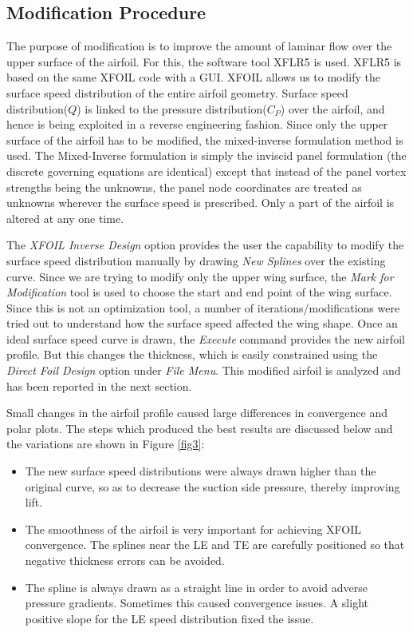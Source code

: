 \documentclass[main.tex]{subfiles}
\begin{document}
\subsection{Modification Procedure}
\par The purpose of modification is to improve the amount of laminar flow over the upper surface of the airfoil. For this, the software tool XFLR5 is used. XFLR5 is based on the same XFOIL code with a GUI. XFOIL allows us to modify the surface speed distribution of the entire airfoil geometry\cite{xfoilmanual}. Surface speed distribution($Q$) is linked to the pressure distribution($C_P$) over the airfoil, and hence is being exploited in a reverse engineering fashion. Since only the upper surface of the airfoil has to be modified, the mixed-inverse formulation method is used. The Mixed-Inverse formulation is simply the inviscid panel formulation (the discrete governing equations are identical) except that instead of the panel vortex strengths being the unknowns, the panel node coordinates are treated as unknowns wherever the surface speed is prescribed.  Only a part of the airfoil is altered at any one time\cite{xfoilmanual}.
\\
\par The \textit{XFOIL Inverse Design} option provides the user the capability to modify the surface speed distribution manually by drawing \textit{New Splines} over the existing curve. Since we are trying to modify only the upper wing surface, the \textit{Mark for Modification} tool is used to choose the start and end point of the wing surface. Since this is not an optimization tool, a number of iterations/modifications were tried out to understand how the surface speed affected the wing shape. Once an ideal surface speed curve is drawn, the \textit{Execute} command provides the new airfoil profile. But this changes the thickness, which is easily constrained using the \textit{Direct Foil Design} option under \textit{File Menu}. This modified airfoil is analyzed and has been reported in the next section. 
\\
\par Small changes in the airfoil profile caused large differences in convergence and polar plots. The steps which produced the best results are discussed below and the variations are shown in Figure \ref{fig3}:
\begin{itemize}
    \item The new surface speed distributions were always drawn higher than the original curve, so as to decrease the suction side pressure, thereby improving lift.
    \item The smoothness of the airfoil is very important for achieving XFOIL convergence. The splines near the LE and TE are carefully positioned so that negative thickness errors can be avoided.
    \item The spline is always drawn as a straight line in order to avoid adverse pressure gradients. Sometimes this caused convergence issues. A slight positive slope for the LE speed distribution fixed the issue.\\
\end{itemize}
\end{document}
